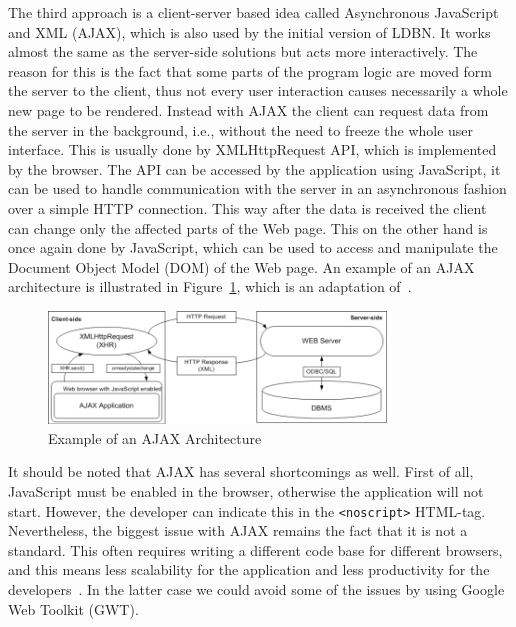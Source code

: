 The third approach is
a client-server based idea called Asynchronous JavaScript and XML (AJAX),
which is also used by the initial version of LDBN. 
It works almost the same as the server-side solutions but acts more interactively. The
reason for this is the fact that some parts of the program logic are moved form the server
to the client, thus not every user interaction causes necessarily a whole new page
to be rendered. Instead with AJAX the client can request 
data from the server in the background, i.e., without the need to freeze the whole user interface. 
This is usually done by XMLHttpRequest API, which is implemented
by the browser. The API can be accessed by the application using JavaScript, it can be
used to handle communication with the server in an asynchronous fashion over a
simple HTTP connection.
This way after the data is received the client can change only the affected parts of the Web page. 
This on the other hand is once again done by JavaScript, which 
can be used to access and manipulate the Document Object Model (DOM) of the Web page.
An example of an AJAX architecture is illustrated in Figure~\ref{fig:ajax01}, 
which is an adaptation of~\cite[Figure 3.1]{mt1}.

\begin{figure}[h]
	\begin{center}
		\includegraphics[width=0.8\textwidth]{./img/ajax01a.png}
		\caption{Example of an AJAX Architecture}
		\label{fig:ajax01}
	\end{center}
\end{figure}


It should be noted that AJAX has several shortcomings as well. First of all, 
JavaScript must be enabled in the browser, otherwise the application will not start.
However, the developer can indicate this in the \verb=<noscript>= HTML-tag. 
Nevertheless, the biggest issue with AJAX remains the fact that it is not a
standard. This often requires writing a different code base for different
browsers, and this means less scalability for the application and less productivity for
the developers~\cite{bgwt2}. In the latter case we could avoid some of the issues by using 
Google Web Toolkit (GWT).


